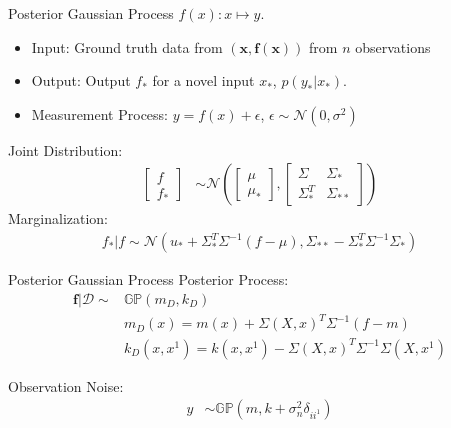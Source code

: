 \begin{frame}{Posterior Gaussian Process}
$f(x): x \mapsto y$. 
\begin{itemize}
    \item Input: Ground truth data  from $(\mathbf{x},\mathbf{f(x)})$ from $n$ observations
\item Output: Output $f_*$ for a novel input $x_*$, $p(y_*|x_*)$. 
\item Measurement Process: $y = f(x)+\epsilon $, $\epsilon \sim \mathcal{N}(0,\sigma^2)$
\end{itemize}
Joint Distribution:
\begin{align}
    \begin{bmatrix}
        f \\
        f_*
    \end{bmatrix}& \sim
    \mathcal{N}\left(
    \begin{bmatrix}
        \mu\\
        \mu_*
    \end{bmatrix}, 
    \begin{bmatrix}
        \Sigma & \Sigma_* \\
        \Sigma_*^T & \Sigma_{**}
    \end{bmatrix}
    \right)
\end{align}
Marginalization:
\begin{align}
    f_*|f \sim
    \mathcal{N}(u_*+\Sigma_*^T\Sigma^{-1}(f-\mu),\Sigma_{**}-\Sigma_*^T\Sigma^{-1}\Sigma_*)
\end{align}

\end{frame}

\begin{frame}{Posterior Gaussian Process}
 Posterior Process:
\begin{align}
    \mathbf{f}|\mathcal{D} \sim & \mathbb{GP}(m_D,k_D) \nonumber\\
    & m_D(x) = m(x) + \Sigma(X,x)^T\Sigma^{-1}(f-m) \nonumber\\
    & k_D(x,x^1) = k(x,x^1) - \Sigma(X,x)^T\Sigma^{-1}\Sigma(X,x^1)
\end{align}

Observation Noise:
\begin{align}
    y & \sim \mathbb{GP} (m,k+\sigma_n^2\delta_{ii^1})
\end{align}
\end{frame}

